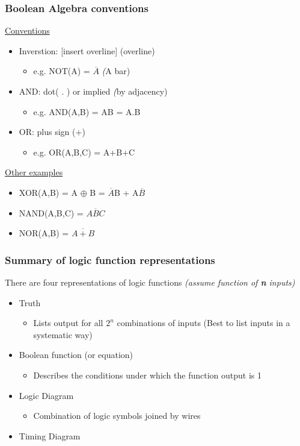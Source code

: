 \documentclass{article}
\begin{document}
\subsubsection{Boolean Algebra conventions}

\underline{Conventions}
\begin{itemize}
\item Inverstion: [insert overline] (overline)
\begin{itemize}
\item e.g. NOT(A) = $\overline{A}$ \textit(A bar)
\end{itemize}

\item AND: dot( . ) or implied \textit(by adjacency)
\begin{itemize}
\item e.g. AND(A,B) = AB = A.B
\end{itemize}

\item OR: plus sign (+)
\begin{itemize}
\item e.g. OR(A,B,C) = A+B+C
\end{itemize}
\end{itemize}

\underline{Other examples}
\begin{itemize}
\item XOR(A,B) = A $\oplus$ B = $\overline{A}$B + A$\overline{B}$
\item NAND(A,B,C) = $\overline{ABC}$
\item NOR(A,B) = $\overline{A+B}$
\end{itemize}

\subsubsection{Summary of logic function representations}
There are four representations of logic functions \textit{(assume function of \textbf{n} inputs)}

\begin{itemize}
\item{Truth}
\begin{itemize}
\item Lists output for all $2^n$ combinations of inputs (Best to list inputs in a systematic way)
\end{itemize}

\item{Boolean function (or equation)}
\begin{itemize}
\item Describes the conditions under which the function output is 1 
\end{itemize}

\item{Logic Diagram}
\begin{itemize}
\item Combination of logic symbols joined by wires
\end{itemize}

\item{Timing Diagram}
\end{itemize}
\end{document}
